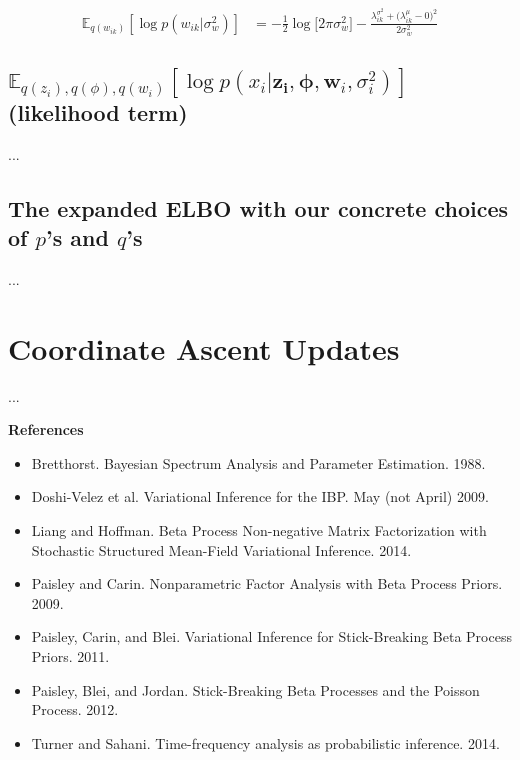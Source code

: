 \documentclass[11pt]{article}
\theoremstyle{definition}
\theoremstyle{plain}
\newcommand{\E}{\mathbb{E}}
\begin{document}
\begin{align*}
    \E_{q(w_{ik})}[ \log p(w_{ik}|\sigma^2_w)] &=
    - \frac{1}{2} \log \Big[2 \pi \sigma^2_{w} \Big]
              - \frac{\lambda_{ik}^{\sigma^2} 
              + \big(\lambda_{ik}^{\mu} - 0 \big)^2}{2 \sigma^2_{w}}
\end{align*}


\subsection{$\E_{q(z_i),q(\phi),q(w_i)}[\log p(x_i | \mathbf{z_i}, \boldsymbol{\phi}, \mathbf{w}_i, \sigma^2_i)]$ (likelihood term)}

...

\subsection{The expanded ELBO with our concrete choices of $p$'s and $q$'s}

...

\section{Coordinate Ascent Updates}

...


\begin{center} \textbf{References} \end{center}
    \begin{itemize}
        \item Bretthorst. Bayesian Spectrum Analysis and Parameter Estimation. 1988.
        \item Doshi-Velez et al. Variational Inference for the IBP. May (not April) 2009.
        \item Liang and Hoffman. Beta Process Non-negative Matrix Factorization with Stochastic Structured Mean-Field Variational Inference. 2014.
        \item Paisley and Carin. Nonparametric Factor Analysis with Beta Process Priors. 2009.
        \item Paisley, Carin, and Blei. Variational Inference for Stick-Breaking Beta Process Priors. 2011.
        \item Paisley, Blei, and Jordan. Stick-Breaking Beta Processes and the Poisson Process. 2012.
        \item Turner and Sahani. Time-frequency analysis as probabilistic inference. 2014. 
    \end{itemize}
\end{document}
